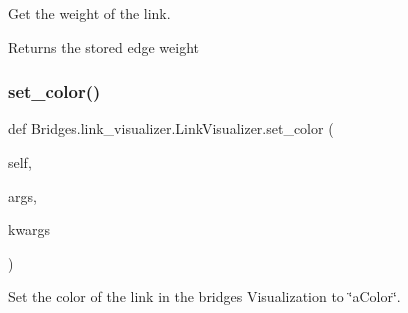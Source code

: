 Get the weight of the link. 

\begin{DoxyReturn}{Returns}
the stored edge weight 
\end{DoxyReturn}
\mbox{\label{class_bridges_1_1link__visualizer_1_1_link_visualizer_a73841d196425d4688aba60226e891da5}} 
\subsubsection{\texorpdfstring{set\+\_\+color()}{set\_color()}}
{\footnotesize\ttfamily def Bridges.\+link\+\_\+visualizer.\+Link\+Visualizer.\+set\+\_\+color (\begin{DoxyParamCaption}\item[{}]{self,  }\item[{}]{args,  }\item[{}]{kwargs }\end{DoxyParamCaption})}



Set the color of the link in the bridges Visualization to \char`\"{}a\+Color\char`\"{}. 


